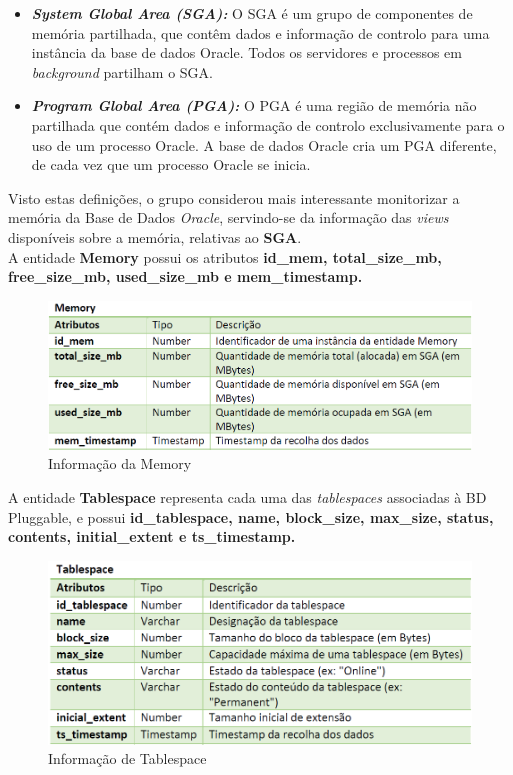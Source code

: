 \documentclass[a4paper]{article}
\begin{document}
\begin{itemize}
    \item \emph{\textbf{System Global Area (SGA):}} O SGA é um grupo de componentes de memória partilhada, que contêm dados e informação de controlo para uma instância da base de dados Oracle. Todos os servidores e processos em \emph{background} partilham o SGA. 
    
    \item \emph{\textbf{Program Global Area (PGA):}} O PGA é uma região de memória não partilhada que contém dados e informação de controlo exclusivamente para o uso de um processo Oracle. A base de dados Oracle cria um PGA diferente, de cada vez que um processo Oracle se inicia.
\end{itemize}

Visto estas definições, o grupo considerou mais interessante monitorizar a memória da Base de Dados \emph{Oracle}, servindo-se da informação das \emph{views} disponíveis sobre a memória, relativas ao \textbf{SGA}.\\

A entidade \textbf{Memory} possui os atributos \textbf{id\_mem, total\_size\_mb, free\_size\_mb, used\_size\_mb e mem\_timestamp.}

\begin{figure}[H]
\centering
\includegraphics[scale=0.65]{memory.PNG}
\caption{Informação da Memory}
\end{figure}

A entidade \textbf{Tablespace} representa cada uma das \emph{tablespaces} associadas à BD Pluggable, e possui \textbf{id\_tablespace, name, block\_size, max\_size, status, contents, initial\_extent e ts\_timestamp.}

\begin{figure}[H]
\centering
\includegraphics[scale=0.65]{tablespace.PNG}
\caption{Informação de Tablespace}
\end{figure}
\end{document}
